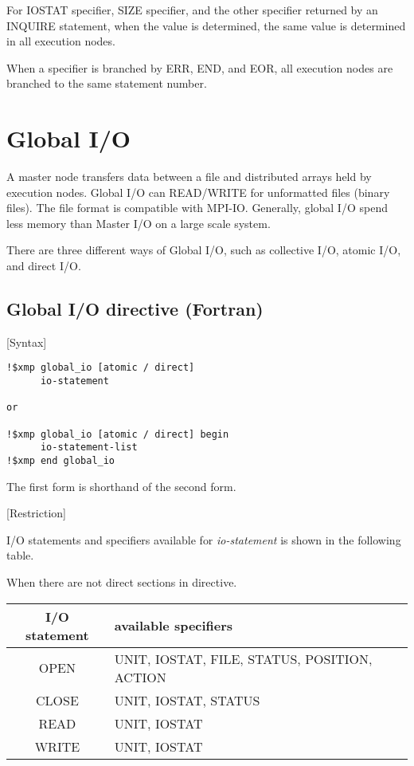    For IOSTAT specifier, SIZE specifier, and the other specifier
   returned by an INQUIRE statement, when the value is determined, the
   same value is determined in all execution nodes.

   When a specifier is branched by ERR, END, and EOR, all execution
   nodes are branched to the same statement number.

   \clearpage
   
   \section{Global I/O}

   A master node transfers data between a file and distributed arrays
   held by execution nodes.
   Global I/O can READ/WRITE for unformatted files (binary files).
   The file format is compatible with MPI-IO.
   Generally, global I/O spend less memory than Master I/O on a large
   scale system.

   There  are three different ways of Global I/O, such as collective
   I/O, atomic I/O, and direct I/O.

   \subsection{Global I/O directive (Fortran)}
   [Syntax]
   
   \begin{verbatim}
!$xmp global_io [atomic / direct]
      io-statement

or

!$xmp global_io [atomic / direct] begin
      io-statement-list
!$xmp end global_io
   \end{verbatim}

   The first form is shorthand of the second form.

   [Restriction]

   I/O statements and specifiers available for {\it io-statement} is
   shown in the following table.

   When there are not direct sections in directive.
   \begin{table}[h]
   \begin{center}
    \label{tb:globalstatement}
    \begin{tabular}{c|l}
     I/O statement & available specifiers \\ \hline
     OPEN & UNIT, IOSTAT, FILE, STATUS, POSITION, ACTION \\
     CLOSE & UNIT, IOSTAT, STATUS \\
     READ & UNIT, IOSTAT \\
     WRITE & UNIT, IOSTAT \\
    \end{tabular}
   \end{center}
   \end{table}

